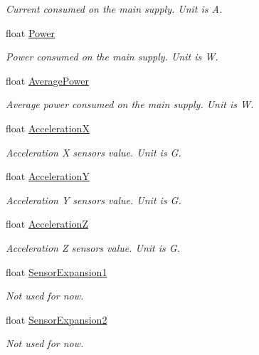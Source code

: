 \begin{DoxyCompactItemize}
\begin{DoxyCompactList}\small\item\em Current consumed on the main supply. Unit is A. \end{DoxyCompactList}\item 
float \hyperlink{struct_general_informations_aacfd4f60945e48471c09376abfbd3c46}{Power}
\begin{DoxyCompactList}\small\item\em Power consumed on the main supply. Unit is W. \end{DoxyCompactList}\item 
float \hyperlink{struct_general_informations_ad7ad2bf957aa53d28a43897efe201b56}{Average\+Power}
\begin{DoxyCompactList}\small\item\em Average power consumed on the main supply. Unit is W. \end{DoxyCompactList}\item 
float \hyperlink{struct_general_informations_a3efc018f27ed117ab22e0058503b5105}{AccelerationX}
\begin{DoxyCompactList}\small\item\em Acceleration X sensor\textquotesingle{}s value. Unit is G. \end{DoxyCompactList}\item 
float \hyperlink{struct_general_informations_a2119e215e49f8bafe8cb5b9ddf8c58b5}{AccelerationY}
\begin{DoxyCompactList}\small\item\em Acceleration Y sensor\textquotesingle{}s value. Unit is G. \end{DoxyCompactList}\item 
float \hyperlink{struct_general_informations_a2a22c6b9b88f19a650137a1e6df8d571}{AccelerationZ}
\begin{DoxyCompactList}\small\item\em Acceleration Z sensor\textquotesingle{}s value. Unit is G. \end{DoxyCompactList}\item 
float \hyperlink{struct_general_informations_add8723743dfc70752472ada7ba50779c}{Sensor\+Expansion1}
\begin{DoxyCompactList}\small\item\em Not used for now. \end{DoxyCompactList}\item 
float \hyperlink{struct_general_informations_af24f37b896bc32e2adeeffa8826036cd}{Sensor\+Expansion2}
\begin{DoxyCompactList}\small\item\em Not used for now. \end{DoxyCompactList}\item 

\end{DoxyCompactItemize}
